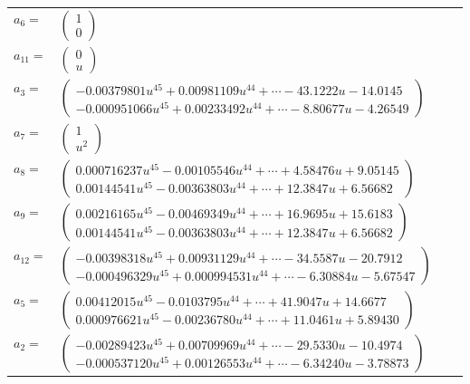 \documentclass[1p]{elsarticle_modified}
\theoremstyle{definition}
\begin{document}
\begin{tabular}{m{7pt} m{180pt} m{7pt} m{180pt} }
\flushright $a_{6}=$&$\begin{pmatrix}1\\0\end{pmatrix}$ \\
\flushright $a_{11}=$&$\begin{pmatrix}0\\u\end{pmatrix}$ \\
\flushright $a_{3}=$&$\begin{pmatrix}-0.00379801 u^{45}+0.00981109 u^{44}+\cdots-43.1222 u-14.0145\\-0.000951066 u^{45}+0.00233492 u^{44}+\cdots-8.80677 u-4.26549\end{pmatrix}$ \\
\flushright $a_{7}=$&$\begin{pmatrix}1\\u^2\end{pmatrix}$ \\
\flushright $a_{8}=$&$\begin{pmatrix}0.000716237 u^{45}-0.00105546 u^{44}+\cdots+4.58476 u+9.05145\\0.00144541 u^{45}-0.00363803 u^{44}+\cdots+12.3847 u+6.56682\end{pmatrix}$ \\
\flushright $a_{9}=$&$\begin{pmatrix}0.00216165 u^{45}-0.00469349 u^{44}+\cdots+16.9695 u+15.6183\\0.00144541 u^{45}-0.00363803 u^{44}+\cdots+12.3847 u+6.56682\end{pmatrix}$ \\
\flushright $a_{12}=$&$\begin{pmatrix}-0.00398318 u^{45}+0.00931129 u^{44}+\cdots-34.5587 u-20.7912\\-0.000496329 u^{45}+0.000994531 u^{44}+\cdots-6.30884 u-5.67547\end{pmatrix}$ \\
\flushright $a_{5}=$&$\begin{pmatrix}0.00412015 u^{45}-0.0103795 u^{44}+\cdots+41.9047 u+14.6677\\0.000976621 u^{45}-0.00236780 u^{44}+\cdots+11.0461 u+5.89430\end{pmatrix}$ \\
\flushright $a_{2}=$&$\begin{pmatrix}-0.00289423 u^{45}+0.00709969 u^{44}+\cdots-29.5330 u-10.4974\\-0.000537120 u^{45}+0.00126553 u^{44}+\cdots-6.34240 u-3.78873\end{pmatrix}$ \\

\end{tabular}
\end{document}
